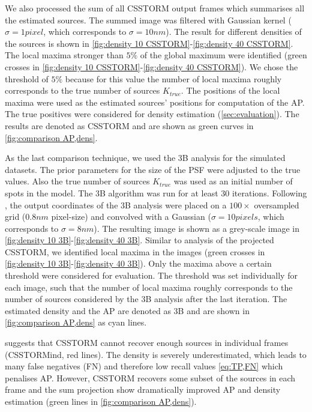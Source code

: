 We also processed the sum of all CSSTORM output frames which summarises all the estimated sources. The summed image was filtered with Gaussian kernel ($\sigma=1\unit{pixel}$, which corresponds to $\sigma=10\unit{nm}$). The result for different densities of the sources is shown in \autoref{fig:density 10 CSSTORM}-\ref{fig:density 40 CSSTORM}. The local maxima stronger than $5\%$ of the global maximum were identified (green crosses in \autoref{fig:density 10 CSSTORM}-\ref{fig:density 40 CSSTORM}). We chose the threshold of $5\%$ because for this value the number of local maxima roughly corresponds to the true number of sources $K_{true}$. The positions of the local maxima were used as the estimated sources' positions for computation of the AP. The true positives were considered for density estimation (\autoref{sec:evaluation}). The results are denoted as \textsf{CSSTORM} and are shown as green curves in \autoref{fig:comparison AP,dens}.

As the last comparison technique, we used the 3B analysis for the simulated datasets. The prior parameters for the size of the PSF were adjusted to the true values. Also the true number of sources $K_{true}$ was used as an initial number of spots in the model. The 3B algorithm was run for at least 30 iterations. Following \cite{Cox2011}, the output coordinates of the 3B analysis were placed on a $100\times$ oversampled grid ($0.8\unit{nm}$ pixel-size) and convolved with a Gaussian ($\sigma=10\unit{pixels}$, which corresponds to $\sigma=8\unit{nm}$). The resulting image is shown as a grey-scale image in \autoref{fig:density 10 3B}-\ref{fig:density 40 3B}. Similar to analysis of the projected CSSTORM, we identified local maxima in the images (green crosses in \autoref{fig:density 10 3B}-\ref{fig:density 40 3B}). Only the maxima above a certain threshold were considered for evaluation. The threshold was set individually for each image, such that the number of local maxima roughly corresponds to the number of sources considered by the 3B analysis after the last iteration. The estimated density and the AP are denoted as \textsf{3B} and are shown in \autoref{fig:comparison AP,dens} as cyan lines. 

 suggests that CSSTORM cannot recover enough sources in individual frames (\textsf{CSSTORMind}, red lines). The density is severely underestimated, which leads to many false negatives (FN) and therefore low recall values \autoref{eq:TP,FN} which penalises AP. However, CSSTORM recovers some subset of the sources in each frame and the sum projection show dramatically improved AP and density estimation (green lines in \autoref{fig:comparison AP,dens}). 

